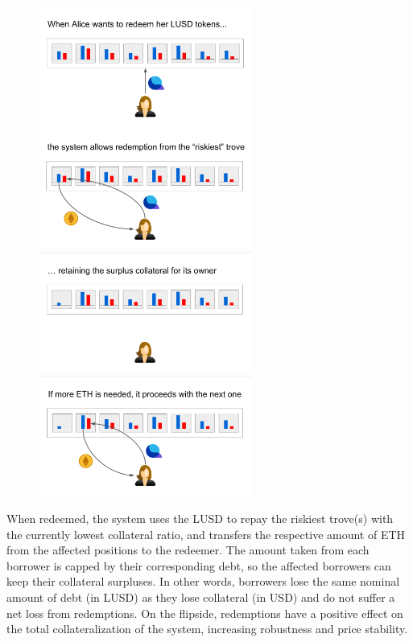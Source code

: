 \documentclass{article}
\begin{document}
\begin{figure}[h]
\centering
\includegraphics[width=7cm]{a1.png}
\includegraphics[width=7cm]{a2.png}
\includegraphics[width=7cm]{a3.png}
\includegraphics[width=7cm]{a4.png}
\end{figure}

When redeemed, the system uses the LUSD to repay the riskiest trove(s) with the currently lowest collateral ratio, and transfers the respective amount of ETH from the affected positions to the redeemer. The amount taken from each borrower is capped by their corresponding debt, so the affected borrowers can keep their collateral surpluses. In other words, borrowers lose the same nominal amount of debt (in LUSD) as they lose collateral (in USD) and do not suffer a net loss from redemptions. On the flipside, redemptions have a positive effect on the total collateralization of the system, increasing robustness and price stability.
\end{document}
